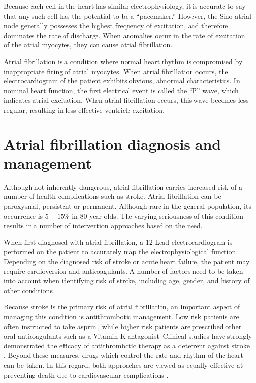 \documentclass[letterpaper,10pt,conference]{ieeeconf}   %
\begin{document}
Because each cell in the heart has similar electrophysiology, it is accurate to say that any such cell has the potential to be a ``pacemaker.'' However, the Sino-atrial node generally possesses the highest frequency of excitation, and therefore dominates the rate of discharge. When anomalies occur in the rate of excitation of the atrial myocytes, they can cause atrial fibrillation. 

Atrial fibrillation is a condition where normal heart rhythm is compromised by inappropriate firing of atrial myocytes. When atrial fibrillation occurs, the electrocardiogram of the patient exhibits obvious, abnormal characteristics. In nominal heart function, the first electrical event is called the “P” wave, which indicates atrial excitation. When atrial fibrillation occurs, this wave becomes less regular, resulting in less effective ventricle excitation.

\section{Atrial fibrillation diagnosis and management}
\label{sec:diagnosisandmanagement}

Although not inherently dangerous, atrial fibrillation carries increased risk of a number of health complications such as stroke. Atrial fibrillation can be paroxysmal, persistent or permanent.  Although rare in the general population, its occurrence is $5-15\%$ in 80 year olds. The varying seriousness of this condition results in a number of intervention approaches based on the need.

When first diagnosed with atrial fibrillation, a 12-Lead electrocardiogram is performed on the patient to accurately map the electrophysiological function. Depending on the diagnosed risk of stroke or acute heart failure, the patient may require cardioversion and anticoagulants.  A number of factors need to be taken into account when identifying risk of stroke, including age, gender, and history of other conditions \cite{lip:10a}.

Because stroke is the primary risk of atrial fibrillation, an important aspect of managing this condition is antithrombotic management. Low risk patients are often instructed to take asprin \cite{camm:10a}, while higher risk patients are prescribed other oral anticoagulants such as a Vitamin K antagonist. Clinical studies have strongly demonstrated the efficacy of antithrombotic therapy as a deterrent against stroke \cite{hart:07a}. Beyond these measures, drugs which control the rate and rhythm of the heart can be taken. In this regard, both approaches are viewed as equally effective at preventing death due to cardiovascular complications \cite{camm:10a,atrial:02a,van:02a}.   
\end{document}
